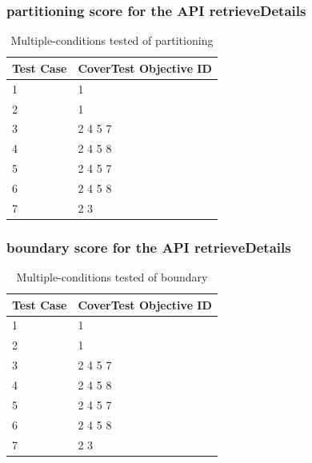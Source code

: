 \documentclass{article}
\begin{document}
\subsubsection{partitioning score for the API retrieveDetails}
\begin{longtable}{|p{2cm}|p{8cm}|}
\caption{Multiple-conditions tested of partitioning}\\
\hline 
Test Case& CoverTest Objective ID\\
\hline  
1&1\\
\hline
2&1\\
\hline
3&2 4 5 7\\
\hline
4&2 4 5 8\\
\hline
5&2 4 5 7\\
\hline
6&2 4 5 8\\
\hline
7&2 3\\
\hline
\end{longtable}
\subsubsection{boundary score for the API retrieveDetails}
\begin{longtable}{|p{2cm}|p{8cm}|}
\caption{Multiple-conditions tested of boundary}\\
\hline 
Test Case& CoverTest Objective ID\\
\hline  
1&1\\
\hline
2&1\\
\hline
3&2 4 5 7\\
\hline
4&2 4 5 8\\
\hline
5&2 4 5 7\\
\hline
6&2 4 5 8\\
\hline
7&2 3\\
\hline
\end{longtable}
\enddocument
\end{document}
